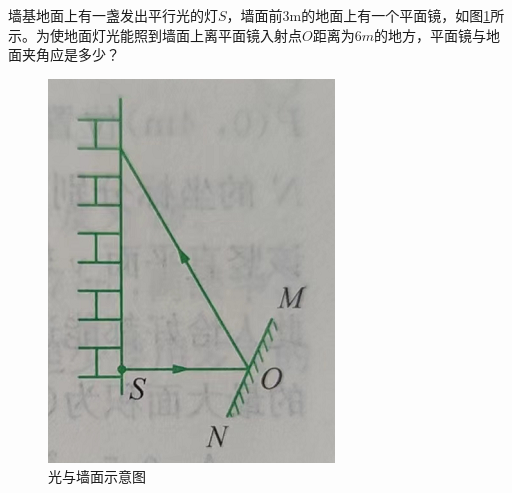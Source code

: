\documentclass[windows,csize4, answers]{BHCexam}
\begin{document}
\begin{groups}
\begin{questions}[]
        \question[5] 墙基地面上有一盏发出平行光的灯$S$，墙面前3m的地面上有一个平面镜，如图\ref{fig:fig_3_12}所示。为使地面灯光能照到墙面上离平面镜入射点$O$距离为$6m$的地方，平面镜与地面夹角应是多少？
        \begin{figure}[htb]
            \centering
            \includegraphics [scale=0.5,trim=0 0 0 0]{./image/fig_3_12.PNG}
            \caption{光与墙面示意图}
            \label{fig:fig_3_12}
        \end{figure}
        \vspace{3cm}


\end{questions}
\end{groups}
\end{document}
